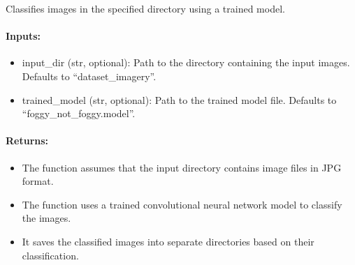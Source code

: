\documentclass[letterpaper,10pt,english]{sphinxmanual}
\begin{document}

\begin{fulllineitems}
\label{\detokenize{akhdefo_functions:akhdefo_functions.Akhdefo_Tools.classification}}
\pysigstartsignatures
{}
\pysigstopsignatures
\sphinxAtStartPar
Classifies images in the specified directory using a trained model.


\paragraph{Inputs:}
\label{\detokenize{akhdefo_functions:inputs}}\begin{itemize}
\item {} 
\sphinxAtStartPar
input\_dir (str, optional): Path to the directory containing the input images. Defaults to “dataset\_imagery”.

\item {} 
\sphinxAtStartPar
trained\_model (str, optional): Path to the trained model file. Defaults to “foggy\_not\_foggy.model”.

\end{itemize}


\paragraph{Returns:}
\label{\detokenize{akhdefo_functions:id13}}\begin{itemize}
\item {} 
\sphinxAtStartPar
The function assumes that the input directory contains image files in JPG format.

\item {} 
\sphinxAtStartPar
The function uses a trained convolutional neural network model to classify the images.

\item {} 
\sphinxAtStartPar
It saves the classified images into separate directories based on their classification.

\end{itemize}

\end{fulllineitems}
\end{document}
